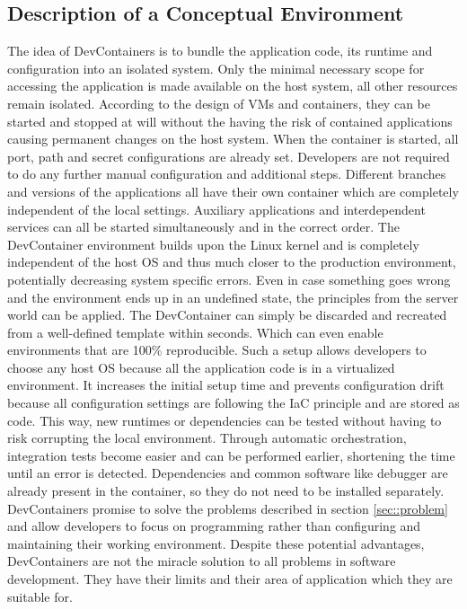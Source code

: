     \subsection{Description of a Conceptual Environment}
    The idea of DevContainers is to bundle the application code, its runtime and configuration into an isolated system. Only the minimal necessary scope for accessing the application is made available on the host system, all other resources remain isolated. According to the design of \ac{VM}s and containers, they can be started and stopped at will without the having the risk of contained applications causing permanent changes on the host system. When the container is started, all port, path and secret configurations are already set. Developers are not required to do any further manual configuration and additional steps. Different branches and versions of the applications all have their own container which are completely independent of the local settings. Auxiliary applications and interdependent services can all be started simultaneously and in the correct order. The DevContainer environment builds upon the Linux kernel and is completely independent of the host \ac{OS} and thus much closer to the production environment, potentially decreasing system specific errors. Even in case something goes wrong and the environment ends up in an undefined state, the principles from the server world can be applied. The DevContainer can simply be discarded and recreated from a well-defined template within seconds. Which can even enable environments that are 100\% reproducible.\newline
    Such a setup allows developers to choose any host \acl{OS} because all the application code is in a virtualized environment. It increases the initial setup time and prevents configuration drift because all configuration settings are following the \ac{IaC} principle and are stored as code. This way, new runtimes or dependencies can be tested without having to risk corrupting the local environment. Through automatic orchestration, integration tests become easier and can be performed earlier, shortening the time until an error is detected. Dependencies and common software like debugger are already present in the container, so they do not need to be installed separately. DevContainers promise to solve the problems described in section \ref{sec::problem} and allow developers to focus on programming rather than configuring and maintaining their working environment.\newline
    Despite these potential advantages, DevContainers are not the miracle solution to all problems in software development. They have their limits and their area of application which they are suitable for.

